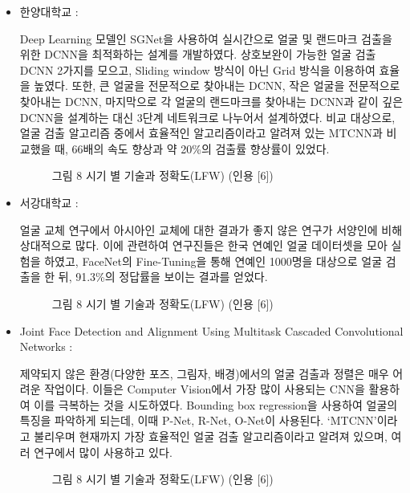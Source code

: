 \documentclass{oblivoir}
\begin{document}
\begin{itemize}[가. ]
    \item 한양대학교 :

Deep Learning 모델인 SGNet을 사용하여 실시간으로 얼굴 및 랜드마크 검출을 위한 DCNN을 최적화하는 설계를 개발하였다. 
상호보완이 가능한 얼굴 검출 DCNN 2가지를 모으고, Sliding window 방식이 아닌 Grid 방식을 이용하여 효율을 높였다. 
또한, 큰 얼굴을 전문적으로 찾아내는 DCNN, 작은 얼굴을 전문적으로 찾아내는 DCNN, 마지막으로 각 얼굴의 랜드마크를 찾아내는 DCNN과
 같이 깊은 DCNN을 설계하는 대신 3단계 네트워크로 나누어서 설계하였다. 비교 대상으로, 
 얼굴 검출 알고리즘 중에서 효율적인 알고리즘이라고 알려져 있는 MTCNN과 비교했을 때, 66배의 속도 향상과 약 20\%의 검출률 향상률이 있었다.

 \begin{figure}[h!]
    \centering
    \caption{그림 8  시기 별 기술과 정확도(LFW) (인용 [6])    }
\end{figure}

    \item 서강대학교 : 
    
얼굴 교체 연구에서 아시아인 교체에 대한 결과가 좋지 않은 연구가 서양인에 비해 상대적으로 많다.
 이에 관련하여 연구진들은 한국 연예인 얼굴 데이터셋을 모아 실험을 하였고, 
 FaceNet의 Fine-Tuning을 통해 연예인 1000명을 대상으로 얼굴 검출을 한 뒤, 
 91.3\%의 정답률을 보이는 결과를 얻었다.

 \begin{figure}[h!]
    \centering
    \caption{그림 8  시기 별 기술과 정확도(LFW) (인용 [6])    }
\end{figure}

    \item Joint Face Detection and Alignment Using Multitask Cascaded Convolutional Networks : 

제약되지 않은 환경(다양한 포즈, 그림자, 배경)에서의 얼굴 검출과 정렬은 매우 어려운 작업이다. 
이들은 Computer Vision에서 가장 많이 사용되는 CNN을 활용하여 이를 극복하는 것을 시도하였다.
 Bounding box regression을 사용하여 얼굴의 특징을 파악하게 되는데, 이때 P-Net, R-Net, O-Net이 사용된다.
 ‘MTCNN’이라고 불리우며 현재까지 가장 효율적인 얼굴 검출 알고리즘이라고 알려져 있으며, 여러 연구에서 많이 사용하고 있다. 

 \begin{figure}[h!]
    \centering
    \caption{그림 8  시기 별 기술과 정확도(LFW) (인용 [6])    }
\end{figure}


\end{itemize}
\end{document}
